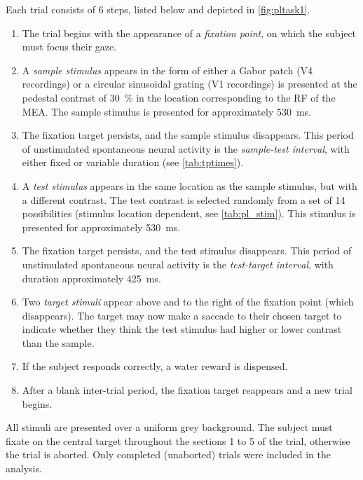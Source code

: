 Each trial consists of 6 steps, listed below and depicted in \autoref{fig:pltask1}.
\begin{enumerate}
\item The trial begins with the appearance of a \textit{fixation point}, on which the subject must focus their gaze.
\item A \textit{sample stimulus} appears in the form of either a Gabor patch (\ac{V4} recordings) or a circular sinusoidal grating (\ac{V1} recordings) is presented at the pedestal contrast of \SI{30}{\percent} in the location corresponding to the \ac{RF} of the \ac{MEA}.
The sample stimulus is presented for approximately \SI{530}{\milli\second}.
\item The fixation target persists, and the sample stimulus disappears.
This period of unstimulated spontaneous neural activity is the \textit{sample-test interval}, with either fixed or variable duration (see \autoref{tab:tptimes}).
\item A \textit{test stimulus} appears in the same location as the sample stimulus, but with a different contrast.
The test contrast is selected randomly from a set of 14 possibilities (stimulus location dependent, see \autoref{tab:pl_stim}).
This stimulus is presented for approximately \SI{530}{\milli\second}.
\item The fixation target persists, and the test stimulus disappears.
This period of unstimulated spontaneous neural activity is the \textit{test-target interval}, with duration approximately \SI{425}{\milli\second}.
\item Two \textit{target stimuli} appear above and to the right of the fixation point (which disappears).
The target may now make a saccade to their chosen target to indicate whether they think the test stimulus had higher or lower contrast than the sample.
\item If the subject responds correctly, a water reward is dispensed.
\item After a blank inter-trial period, the fixation target reappears and a new trial begins.
\end{enumerate}
All stimuli are presented over a uniform grey background.
The subject must fixate on the central target throughout the sections 1 to 5 of the trial, otherwise the trial is aborted.
Only completed (unaborted) trials were included in the analysis.


